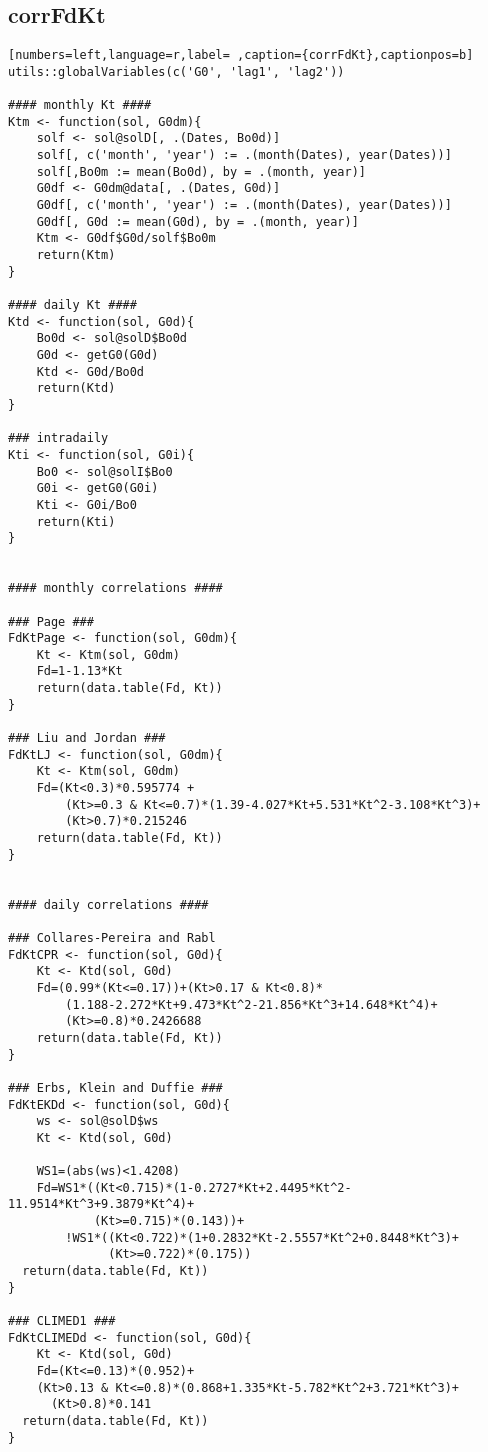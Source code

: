 \subsection{corrFdKt}
\label{sec:orge829281}
\label{subsec:corrfdkt}
\begin{lstlisting}[numbers=left,language=r,label= ,caption={corrFdKt},captionpos=b]
utils::globalVariables(c('G0', 'lag1', 'lag2'))

#### monthly Kt ####
Ktm <- function(sol, G0dm){
    solf <- sol@solD[, .(Dates, Bo0d)]
    solf[, c('month', 'year') := .(month(Dates), year(Dates))]
    solf[,Bo0m := mean(Bo0d), by = .(month, year)]
    G0df <- G0dm@data[, .(Dates, G0d)]
    G0df[, c('month', 'year') := .(month(Dates), year(Dates))]
    G0df[, G0d := mean(G0d), by = .(month, year)]
    Ktm <- G0df$G0d/solf$Bo0m
    return(Ktm)
}

#### daily Kt ####
Ktd <- function(sol, G0d){
    Bo0d <- sol@solD$Bo0d
    G0d <- getG0(G0d)
    Ktd <- G0d/Bo0d
    return(Ktd)
}

### intradaily
Kti <- function(sol, G0i){
    Bo0 <- sol@solI$Bo0
    G0i <- getG0(G0i)
    Kti <- G0i/Bo0
    return(Kti)
}


#### monthly correlations ####

### Page ###
FdKtPage <- function(sol, G0dm){
    Kt <- Ktm(sol, G0dm)
    Fd=1-1.13*Kt
    return(data.table(Fd, Kt))
}

### Liu and Jordan ###
FdKtLJ <- function(sol, G0dm){
    Kt <- Ktm(sol, G0dm)
    Fd=(Kt<0.3)*0.595774 +
        (Kt>=0.3 & Kt<=0.7)*(1.39-4.027*Kt+5.531*Kt^2-3.108*Kt^3)+
        (Kt>0.7)*0.215246
    return(data.table(Fd, Kt))
}


#### daily correlations ####

### Collares-Pereira and Rabl
FdKtCPR <- function(sol, G0d){
    Kt <- Ktd(sol, G0d)
    Fd=(0.99*(Kt<=0.17))+(Kt>0.17 & Kt<0.8)*
        (1.188-2.272*Kt+9.473*Kt^2-21.856*Kt^3+14.648*Kt^4)+
        (Kt>=0.8)*0.2426688      
    return(data.table(Fd, Kt))
}

### Erbs, Klein and Duffie ###
FdKtEKDd <- function(sol, G0d){
    ws <- sol@solD$ws
    Kt <- Ktd(sol, G0d)

    WS1=(abs(ws)<1.4208)
    Fd=WS1*((Kt<0.715)*(1-0.2727*Kt+2.4495*Kt^2-11.9514*Kt^3+9.3879*Kt^4)+
            (Kt>=0.715)*(0.143))+
        !WS1*((Kt<0.722)*(1+0.2832*Kt-2.5557*Kt^2+0.8448*Kt^3)+
              (Kt>=0.722)*(0.175))
  return(data.table(Fd, Kt))
}

### CLIMED1 ###
FdKtCLIMEDd <- function(sol, G0d){
    Kt <- Ktd(sol, G0d)
    Fd=(Kt<=0.13)*(0.952)+
    (Kt>0.13 & Kt<=0.8)*(0.868+1.335*Kt-5.782*Kt^2+3.721*Kt^3)+
      (Kt>0.8)*0.141
  return(data.table(Fd, Kt))
}


\end{lstlisting}
